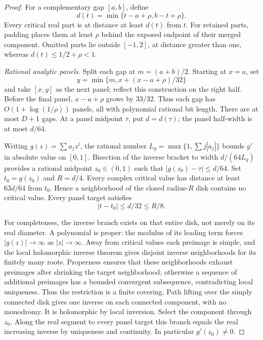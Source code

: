 \begin{proof}
For a complementary gap $[a,b]$, define
\[
                    d(t)=\min\{t-a+\rho,b-t+\rho\}.
\]
Every critical real part is at distance at least $d(t)$ from $t$.
For retained parts, padding places them at least $\rho$ behind the
exposed endpoint of their merged component. Omitted parts lie outside
$[-1,2]$, at distance greater than one, whereas
$d(t)\le1/2+\rho<1$.

\emph{Rational analytic panels.}
Split each gap at $m=(a+b)/2$. Starting at $x=a$, set
\[
                  y=\min\{m,x+(x-a+\rho)/32\}
\]
and take $[x,y]$ as the next panel; reflect this construction on the
right half. Before the final panel, $x-a+\rho$ grows by $33/32$.
Thus each gap has $O(1+\log(1/\rho))$ panels, all with polynomial
rational bit length. There are at most $D+1$ gaps. At a panel midpoint
$\tau$, put $d=d(\tau)$; the panel half-width is at most $d/64$.

Writing $g(z)=\sum a_jz^j$, the rational number
$L_g=\max\{1,\sum j|a_j|\}$ bounds $g'$ in absolute value on
$[0,1]$. Bisection of the inverse bracket to width $d/(64L_g)$
provides a rational midpoint $z_0\in(0,1)$ such that
$|g(z_0)-\tau|\le d/64$. Set $t_0=g(z_0)$ and $R=d/4$.
Every complex critical value has distance at least $63d/64$ from
$t_0$. Hence a neighborhood of the closed radius-$R$ disk contains
no critical value. Every panel target satisfies
\begin{equation}\label{eq:inverse-panel-ratio}
                       |t-t_0|\le d/32\le R/8.
\end{equation}

For completeness, the inverse branch exists on that entire disk, not
merely on its real diameter. A polynomial is proper: the modulus of its
leading term forces $|g(z)|\to\infty$ as $|z|\to\infty$.
Away from critical values each preimage is simple, and the local
holomorphic inverse theorem gives disjoint inverse neighborhoods for
its finitely many roots. Properness ensures that these neighborhoods
exhaust preimages after shrinking the target neighborhood; otherwise a
sequence of additional preimages has a bounded convergent subsequence,
contradicting local uniqueness. Thus the restriction is a finite
covering. Path lifting over the simply connected disk gives one inverse
on each connected component, with no monodromy. It is holomorphic by
local inversion. Select the component through $z_0$. Along the real
segment to every panel target this branch equals the real increasing
inverse by uniqueness and continuity. In particular $g'(z_0)\ne0$.


\end{proof}
